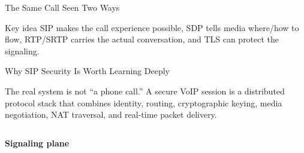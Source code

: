 \documentclass[aspectratio=169]{beamer}
\begin{document}
\begin{frame}{The Same Call Seen Two Ways}

\vspace{0.3cm}

\begin{block}{Key idea}
SIP makes the call experience possible, SDP tells media where/how to flow, RTP/SRTP carries the actual conversation, and TLS can protect the signaling.
\end{block}

\end{frame}


\begin{frame}{Why SIP Security Is Worth Learning Deeply}
\tiny

\begin{block}{The real system is not ``a phone call.''}
A secure VoIP session is a distributed protocol stack that combines identity, routing,
cryptographic keying, media negotiation, NAT traversal, and real-time packet delivery.
\end{block}

\vspace{0.1cm}

\begin{columns}[T]

\textbf{Signaling plane}

\vspace{0.05cm}


\end{columns}
\end{frame}
\end{document}
